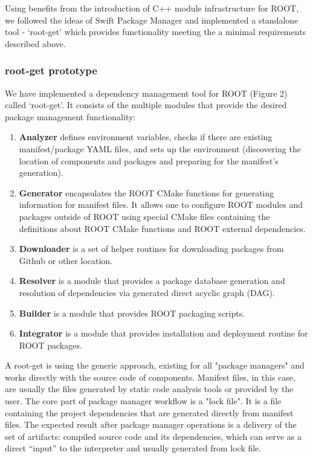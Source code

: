 \documentclass{webofc}
\begin{document}
Using benefits from the introduction of C++ module infrastructure for ROOT, we followed the ideas of Swift Package Manager and implemented a standalone tool - `root-get' which provides functionality meeting the a minimal requirements described above.


\subsubsection{root-get prototype}

We have implemented a dependency management tool for ROOT (Figure 2) called `root-get'. It consists of the multiple modules that provide the desired package management functionality:
\begin{enumerate}
\item \textbf{Analyzer} defines environment variables, checks if there are existing manifest/package YAML files, and sets up the environment (discovering the location of components and packages and preparing for the manifest’s generation).
\item \textbf{Generator} encapsulates the ROOT CMake functions for generating information for  manifest files. It allows one to configure ROOT modules and packages outside of ROOT using special CMake files containing the definitions about ROOT CMake functions and ROOT external dependencies.
\item \textbf{Downloader} is a set of helper routines for downloading packages from Github or other location.
\item \textbf{Resolver} is a module that provides a package database generation and resolution of dependencies via generated direct acyclic graph (DAG).
\item \textbf{Builder} is a module that provides ROOT packaging scripts.
\item \textbf{Integrator} is a module that provides installation and deployment routine for ROOT packages. 
\end{enumerate}


A root-get is using the generic approach, existing for all "package managers" and works directly with the source code of components. Manifest files, in this case, are usually the files generated by static code analysis tools or provided by the user. The core part of package manager workflow is a "lock file". It is a file containing the project dependencies that are generated directly from manifest files. The expected result after package manager operations is a delivery of the set of artifacts: compiled source code and its dependencies, which can serve as a direct “input” to the interpreter and usually generated from lock file.
\end{document}
